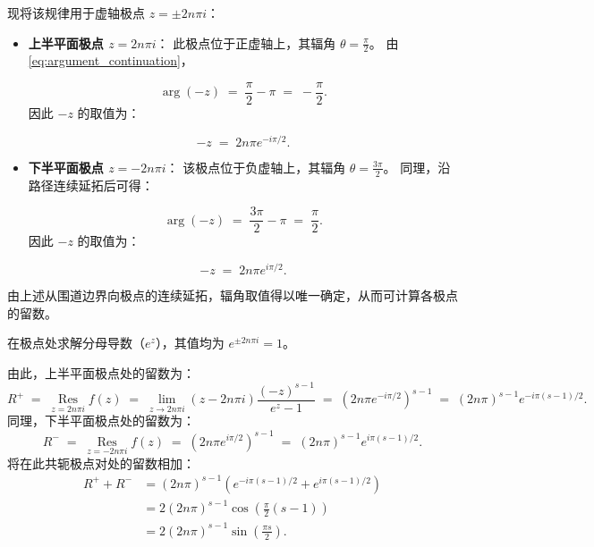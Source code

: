 现将该规律用于虚轴极点 $z = \pm 2n\pi i$：
\begin{itemize}
  \item \textbf{上半平面极点 $z = 2n\pi i$}：
  此极点位于正虚轴上，其辐角 $\theta = \frac{\pi}{2}$。
  由\eqref{eq:argument_continuation}，

  \[
    \arg(-z) \;=\; \frac{\pi}{2} - \pi \;=\; -\frac{\pi}{2}.
  \]
  因此 $-z$ 的取值为：

  \[
    -z \;=\; 2n\pi e^{-i\pi/2}.
  \]
  \item \textbf{下半平面极点 $z = -2n\pi i$}：
  该极点位于负虚轴上，其辐角 $\theta = \frac{3\pi}{2}$。
  同理，沿路径连续延拓后可得：

  \[
    \arg(-z) \;=\; \frac{3\pi}{2} - \pi \;=\; \frac{\pi}{2}.
  \]
  因此 $-z$ 的取值为：

  \[
    -z \;=\; 2n\pi e^{i\pi/2}.
  \]
\end{itemize}

由上述从围道边界向极点的连续延拓，辐角取值得以唯一确定，从而可计算各极点的留数。

在极点处求解分母导数（$e^z$），其值均为 $e^{\pm 2n\pi i} = 1$。

由此，上半平面极点处的留数为：
\[
  R^+ \;=\; \mathop{\mathrm{Res}}\limits_{z=2n\pi i} f(z) \;=\; \lim_{z \to 2n\pi i} (z - 2n\pi i) \frac{(-z)^{s-1}}{e^z - 1} \;=\; (2n\pi e^{-i\pi/2})^{s-1} \;=\; (2n\pi)^{s-1} e^{-i\pi(s-1)/2}.
\]
同理，下半平面极点处的留数为：
\[
  R^- \;=\; \mathop{\mathrm{Res}}\limits_{z=-2n\pi i} f(z) \;=\; (2n\pi e^{i\pi/2})^{s-1} \;=\; (2n\pi)^{s-1} e^{i\pi(s-1)/2}.
\]
将在此共轭极点对处的留数相加：
\begin{align*}
  R^+ + R^- &= (2n\pi)^{s-1} \left( e^{-i\pi(s-1)/2} + e^{i\pi(s-1)/2} \right) \\
  &= 2(2n\pi)^{s-1} \cos\left(\frac{\pi}{2}(s-1)\right) \\
  &= 2(2n\pi)^{s-1} \sin\left(\frac{\pi s}{2}\right).
\end{align*}

